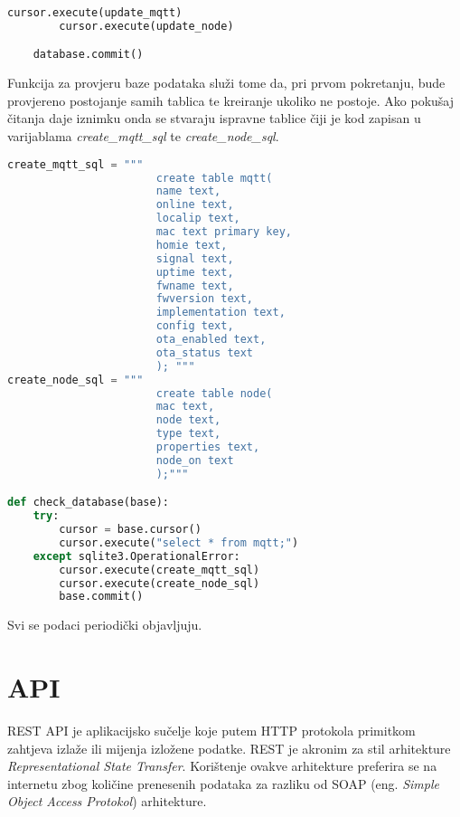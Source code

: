 \documentclass[times, utf8, zavrsni]{fer}
\begin{document}
{\begin{lstlisting}[language=Python, caption=Parsiranje poruka i spremanje u bazu podataka]
        cursor.execute(update_mqtt)
        cursor.execute(update_node)

    database.commit()

\end{lstlisting}

Funkcija za provjeru baze podataka služi tome da, pri prvom pokretanju, bude provjereno postojanje samih tablica te kreiranje ukoliko ne postoje.
Ako pokušaj čitanja daje iznimku onda se stvaraju ispravne tablice čiji je kod zapisan u varijablama \textit{create\_mqtt\_sql} te \textit{create\_node\_sql}.
\begin{lstlisting}[language=Python, caption=Funkcija za provjeru baze podataka]
create_mqtt_sql = """
                       create table mqtt(
                       name text,
                       online text,
                       localip text,
                       mac text primary key,
                       homie text,
                       signal text,
                       uptime text,
                       fwname text,
                       fwversion text,
                       implementation text,
                       config text,
                       ota_enabled text,
                       ota_status text
                       ); """
create_node_sql = """
                       create table node(
                       mac text,
                       node text,
                       type text,
                       properties text,
                       node_on text
                       );"""

def check_database(base):
    try:
        cursor = base.cursor()
        cursor.execute("select * from mqtt;")
    except sqlite3.OperationalError:
        cursor.execute(create_mqtt_sql)
        cursor.execute(create_node_sql)
        base.commit()
\end{lstlisting}

Svi se podaci periodički objavljuju.

\section{API}
REST API je aplikacijsko sučelje koje putem HTTP protokola primitkom zahtjeva izlaže ili mijenja izložene podatke.
REST je akronim za stil arhitekture \textit{Representational State Transfer}.
Korištenje ovakve arhitekture preferira se na internetu zbog količine prenesenih podataka za razliku od SOAP (eng. \textit{Simple Object Access Protokol}) arhitekture.

}
\end{document}
